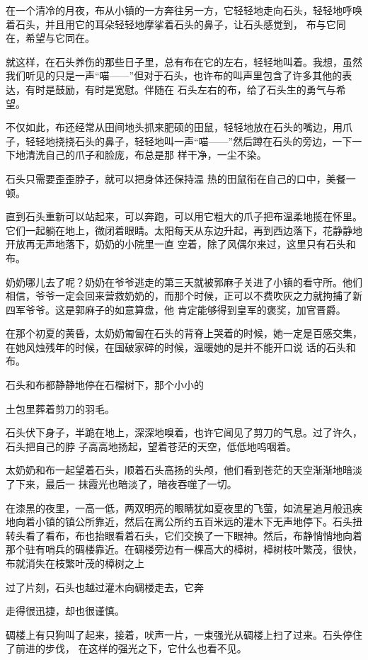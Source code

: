 \documentclass{article}
\begin{document}
在一个清冷的月夜，布从小镇的一方奔往另一方，它轻轻地走向石头，轻轻地呼唤着石头，并且用它的耳朵轻轻地摩挲着石头的鼻子，让石头感觉到，
布与它同在，希望与它同在。 

就这样，在石头养伤的那些日子里，总有布在它的左右，轻轻地叫着。我想，虽然我们听见的只是一声“喵——”但对于石头，也许布的叫声里包含了许多其他的表达，有时是鼓励，有时是宽慰。伴随在
石头左右的布，给了石头生的勇气与希望。 

不仅如此，布还经常从田间地头抓来肥硕的田鼠，轻轻地放在石头的嘴边，用爪子，轻轻地挠挠石头的鼻子，轻轻地叫一声“喵——”然后蹲在石头的旁边，一下一下地清洗自己的爪子和脸庞，布总是那
样干净，一尘不染。 

\newpage

石头只需要歪歪脖子，就可以把身体还保持温
热的田鼠衔在自己的口中，美餐一顿。 

直到石头重新可以站起来，可以奔跑，可以用它粗大的爪子把布温柔地揽在怀里。它们一起躺在地上，微闭着眼睛。太阳每天从东边升起，再到西边落下，花静静地开放再无声地落下，奶奶的小院里一直
空着，除了风偶尔来过，这里只有石头和布。 

奶奶哪儿去了呢？奶奶在爷爷逃走的第三天就被郭麻子关进了小镇的看守所。他们相信，爷爷一定会回来营救奶奶的，而那个时候，正可以不费吹灰之力就拘捕了新四军爷爷。这是郭麻子的如意算盘，他
肯定能够得到皇军的褒奖，加官晋爵。 

在那个初夏的黄昏，太奶奶匍匐在石头的背脊上哭着的时候，她一定是百感交集，在她风烛残年的时候，在国破家碎的时候，温暖她的是并不能开口说
话的石头和布。 

石头和布都静静地停在石榴树下，那个小小的
\newpage

土包里葬着剪刀的羽毛。 

石头伏下身子，半跪在地上，深深地嗅着，也许它闻见了剪刀的气息。过了许久，石头把自己的脖
子高高地扬起，望着苍茫的天空，低低地呜咽着。 

太奶奶和布一起望着石头，顺着石头高扬的头颅，他们看到苍茫的天空渐渐地暗淡了下来，最后一
抹霞光也暗淡了，暗夜吞噬了一切。 


在漆黑的夜里，一高一低，两双明亮的眼睛犹如夏夜里的飞萤，如流星追月般迅疾地向着小镇的镇公所靠近，然后在离公所约五百米远的灌木下无声地停下。石头扭转头看了看布，布也抬眼看着石头，它们交换了一下眼神。然后，布静悄悄地向着那个驻有哨兵的碉楼靠近。在碉楼旁边有一棵高大的樟树，樟树枝叶繁茂，很快，布就消失在枝繁叶茂的樟树之上

过了片刻，石头也越过灌木向碉楼走去，它奔

\newpage
走得很迅捷，却也很谨慎。 

碉楼上有只狗叫了起来，接着，吠声一片，一束强光从碉楼上扫了过来。石头停住了前进的步伐，
在这样的强光之下，它什么也看不见。 
\end{document}
